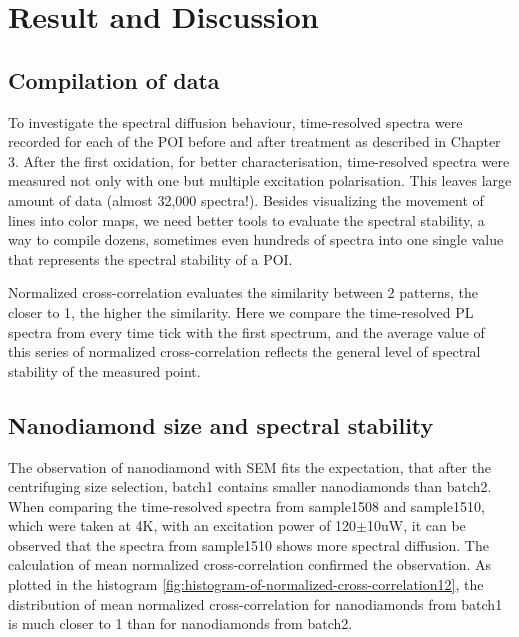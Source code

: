 \chapter{Result and Discussion} %

\label{Chapter2.75} %

\section{Compilation of data}
To investigate the spectral diffusion behaviour, time-resolved spectra were recorded for each of the POI before and after treatment as described in Chapter 3. After the first oxidation, for better characterisation, time-resolved spectra were measured not only with one but multiple excitation polarisation. This leaves large amount of data (almost 32,000 spectra!). Besides visualizing the movement of lines into color maps, we need better tools to evaluate the spectral stability, a way to compile dozens, sometimes even hundreds of spectra into one single value that represents the spectral stability of a POI.

Normalized cross-correlation evaluates the similarity between 2 patterns, the closer to 1, the higher the similarity. Here we compare the time-resolved PL spectra from every time tick with the first spectrum, and the average value of this series of normalized cross-correlation reflects the general level of spectral stability of the measured point.


\section{Nanodiamond size and spectral stability}

The observation of nanodiamond with SEM fits the expectation, that after the centrifuging size selection, batch1 contains smaller nanodiamonds than batch2.  
When comparing the time-resolved spectra from sample1508 and sample1510, which were taken at 4K, with an excitation power of 120$\pm$10uW, it can be observed that the spectra from sample1510 shows more spectral diffusion. The calculation of mean normalized cross-correlation confirmed the observation. As plotted in the histogram \ref{fig:histogram-of-normalized-cross-correlation12}, the distribution of mean normalized cross-correlation for nanodiamonds from batch1 is much closer to 1 than for nanodiamonds from batch2.

